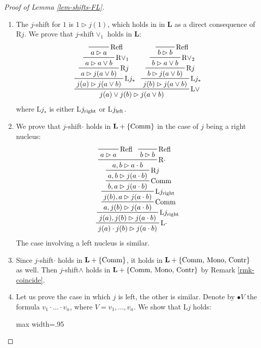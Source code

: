 \documentclass[runningheads]{llncs}
\renewcommand{\L}{\mathbf{L}}
\begin{document}
\begin{proof}[Proof of Lemma \ref{lem-shifts-FL}]\
\begin{enumerate}
	\item The $j$-shift for $1$ is $1\rhd j(1)$, which holds in  in $\L$ as a direct consequence of R$j$.
	We prove that $j$-shift$\vee_1$ holds in $\L$:
	\[
	\prftree[r]{\textnormal{L$\vee$}}{
		\prftree[r]{\textnormal{L$j_*$}}{
			\prftree[r]{\textnormal{R$j$}}{
				\prftree[r]{\textnormal{R$\vee_1$}}{
					\prftree[r]{Refl}{a\rhd a}
				}{a\rhd a\vee b}
			}{a\rhd j(a\vee b)}
		}{j(a)\rhd j(a\vee b)}
	}{
		\prftree[r]{\textnormal{L$j_*$}}{
			\prftree[r]{\textnormal{R$j$}}{
				\prftree[r]{\textnormal{R$\vee_2$}}{
					\prftree[r]{Refl}{b\rhd b}
				}{b\rhd a\vee b}
			}{b\rhd j(a\vee b)}
		}{j(b)\rhd j(a\vee b)}
	}{j(a)\vee j(b)\rhd j(a\vee b)}
	\]
	where L$j_*$ is either L$j_\textnormal{right}$ or L$j_\textnormal{left}$.
	\item We prove that $j$-shift$\cdot$ holds in $\L+\{\textnormal{Comm}\}$ in the case of $j$ being a right nucleus:
	\[
	\prftree[r]{\textnormal{L$\cdot$}}{
		\prftree[r]{\textnormal{L$j_\textnormal{right}$}}{
			\prftree[r]{Comm}{
				\prftree[r]{\textnormal{L$j_\textnormal{right}$}}{
					\prftree[r]{Comm}{
						\prftree[r]{\textnormal{R$j$}}{
							\prftree[r]{\textnormal{R$\cdot$}}{
								\prftree[r]{Refl}{a\rhd a}
							}{
								\prftree[r]{Refl}{b\rhd b}
							}{a, b\rhd a\cdot b}
						}{a, b\rhd j(a\cdot b)}
					}{b,a\rhd j(a\cdot b)}
				}{j(b),a\rhd j(a\cdot b)}
			}{a, j(b)\rhd j(a\cdot b)}
		}{j(a), j(b)\rhd j(a\cdot b)}
	}{j(a)\cdot j(b)\rhd j(a\cdot b)}
	\]    
	The case involving a left nucleus is similar.
	\item 
	Since $j$-shift$\cdot$ holds in $\L+\{\textnormal{Comm}\}$, it holds in $\L+\{\textnormal{Comm, Mono, Contr}\}$ as well. Then $j$-shift$\wedge$ holds in $\L+\{\textnormal{Comm, Mono, Contr}\}$ by Remark \ref{rmk-coincide}.
	\item
	Let us prove the case in which $j$ is left, the other is similar.
	Denote by $\bullet V$ the formula $v_1\cdot...\cdot v_n$, where $V=v_1,...,v_n$. We show that L$j$ holds:

    \begin{adjustbox}{max width=.95\textwidth}
    \end{adjustbox}
	

\end{enumerate}
\end{proof}
\end{document}
